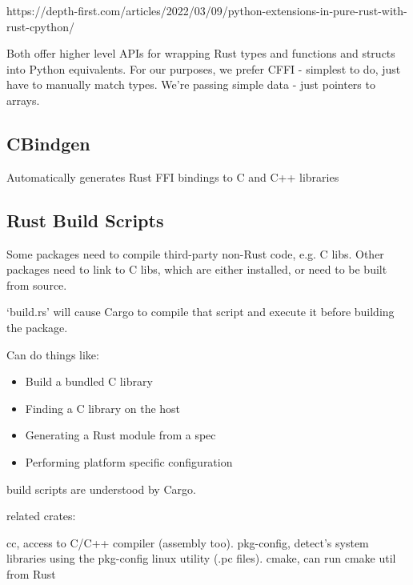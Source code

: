 \documentclass[12pt, a4, twoside]{article}
\begin{document}
https://depth-first.com/articles/2022/03/09/python-extensions-in-pure-rust-with-rust-cpython/

Both offer higher level APIs for wrapping Rust types and functions and structs into Python equivalents. For our purposes, we prefer CFFI - simplest to do, just have to manually match types. We're passing simple data - just pointers to arrays. 

\subsection*{CBindgen}

Automatically generates Rust FFI bindings to C and C++ libraries

\subsection*{Rust Build Scripts}

Some packages need to compile third-party non-Rust code, e.g. C libs. Other packages need to link to C libs,  which are either installed, or need to be built from source.

`build.rs' will cause Cargo to compile that script and execute it before building the package.

Can do things like:

\begin{itemize}
    \item Build a bundled C library
    \item Finding a C library on the host
    \item Generating a Rust module from a spec
    \item Performing platform specific configuration
\end{itemize}


build scripts are understood by Cargo.

related crates:

cc, access to C/C++ compiler (assembly too). pkg-config, detect's system libraries using the pkg-config linux utility (.pc files). cmake, can run cmake util from Rust
\end{document}
